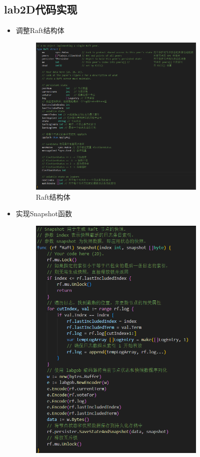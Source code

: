 \documentclass[]{article}
\begin{document}
	\subsection{lab2D代码实现}
	\begin{itemize}
		\item 调整Raft结构体
		\begin{figure}[H]
			\centering
			\includegraphics[width=0.8\textwidth]{./2D/Raft.png}
			\caption{Raft结构体}
		\end{figure}
		\item 实现Snapshot函数
		\begin{figure}[H]
			\centering
			\includegraphics[width=0.8\textwidth]{./2D/Snapshot.png}

\end{figure}
\end{itemize}
\end{document}
